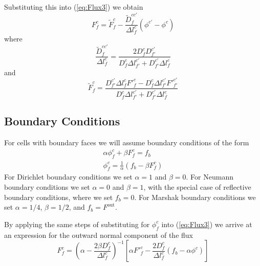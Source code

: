 \documentclass[12pt]{article}
\newcommand{\bfunc}{\ensuremath{f_{b}}}
\begin{document}
Substituting this into (\ref{eq:Flux3}) we obtain
\begin{equation}
    \boxed{
        F^{c}_{f} = 
        \tilde{F}^{c}_{f} -  \frac{\tilde{D}^{cc'}_{f}}{\Delta l^{c}_{f}}
                             \left( \phi^{c'} - \phi^{c} \right)
    }
\label{eq:Finterior}
\end{equation}
where
\begin{equation}
        \frac{\tilde{D}^{cc'}_{f}}{\Delta l^{c}_{f}}
                    = \frac{
                         2 D^{c}_{f} D^{c'}_{f'} 
                       }
                       {
                           D^{c}_{f}   \Delta l^{c'}_{f'}
                        +  D^{c'}_{f'} \Delta l^{c}_{f}
                       }
\end{equation}
and
\begin{equation}
    \tilde{F}^{c}_{f} = \frac
                        { D^{c'}_{f'} \Delta l^{c}_{f} {F'}^{c}_{f}
                            - D^{c}_{f} \Delta l^{c'}_{f'} {F'}^{c'}_{f'}
                        }
                        { D^{c}_{f} \Delta l^{c'}_{f'}
                            + D^{c'}_{f'} \Delta l^{c}_{f}
                        }
\end{equation}

\subsection{Boundary Conditions}

For cells with boundary faces we will assume boundary conditions of the
form
\begin{gather}
        \alpha \phi^{c}_{f} + \beta F^{c}_{f} = \bfunc
  \\
        \phi^{c}_{f} = \frac{1}{\alpha} \left( \bfunc - \beta F^{c}_{f} \right)
\label{eq:phicf_bc}
\end{gather}
For Dirichlet boundary conditions we set $\alpha=1$ and $\beta=0$.
For Neumann boundary conditions we set $\alpha=0$ and $\beta=1$,
 with the special
case of reflective boundary conditions, where we set $\bfunc = 0$.
For Marshak boundary conditions we set $\alpha=1/4$, $\beta=1/2$, and
$\bfunc = F^{\text{out}}$.

By applying the same steps of substituting for $\phi^{c}_{f}$ into
(\ref{eq:Flux3})
we arrive at an expression for the outward normal component of the flux
\begin{equation}
   \boxed{
        F^{c}_{f} = \left( \alpha - \frac{2 \beta D^{c}_{f}}{\Delta l^{c}_{f}}
                    \right)^{-1}
                    \left[ \alpha {F'}^{c}_{f} - \frac{2 D^{c}_{f}}{\Delta l^{c}_{f}}
                                                \left(\bfunc - \alpha \phi^{c}\right)
                    \right]
   }
\label{eq:Fboundary}
\end{equation}
\end{document}
